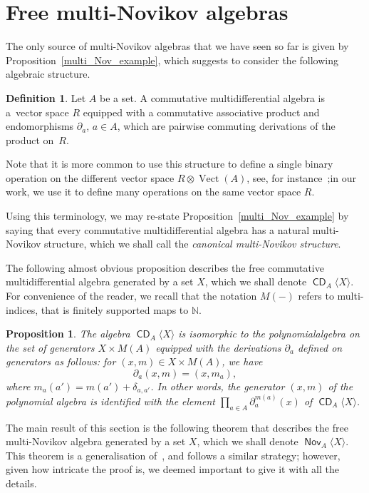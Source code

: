 \documentclass[10pt,a4paper]{article}
\newtheorem{prop}[theo]{Proposition}
\theoremstyle{definition}
\newtheorem{defi}[theo]{Definition}
\numberwithin{equation}{section}
\numberwithin{figure}{section}
\newcommand{\bbN}{\mathbb{N}}
\DeclareMathOperator{\CDi}{\mathsf{CD}}
\DeclareMathOperator{\Nov}{\mathsf{Nov}}
\DeclareMathOperator{\Vect}{Vect}
\begin{document}
\section{Free multi-Novikov algebras}\label{sec::3}
The only source of multi-Novikov algebras that we have seen so far is given by Proposition~\ref{multi_Nov_example}, which suggests to consider the following algebraic structure.

\begin{defi}
Let $A$ be a set. A commutative multidifferential algebra is a~vector space $R$ equipped with a commutative associative product and endomorphisms $\partial_a$, $a\in A$, which are pairwise commuting derivations of the product on~$R$.
\end{defi}

Note that it is more common to use this structure to define a single binary operation on the different vector space $R\otimes\Vect(A)$, see, for instance~\cite[Section~2.1]{Bur};\linebreak in our work, we use it to define many operations on the same vector space $R$.

Using this terminology, we may re-state Proposition~\ref{multi_Nov_example} by saying that every commutative multidifferential algebra has a natural multi-Novikov structure, which we shall call the \emph{canonical multi-Novikov structure}.

The following almost obvious proposition describes the free commutative multidifferential algebra generated by a set $X$, which we shall denote $\CDi_A\langle X\rangle$. For convenience of the reader, we recall that the notation $M(-)$ refers to multi-indices, that is finitely supported maps to $\bbN$.

\begin{prop}
The algebra $\CDi_A\langle X\rangle$ is isomorphic to the polynomial\linebreak algebra on the set of generators $X\times M(A)$ equipped with the derivations $\partial_a$ defined on generators as follows: for $(x,m)\in X\times M(A)$, we have
\[
\partial_a(x,m)=(x,m_a),
\]
where $m_a(a')=m(a')+\delta_{a,a'}$. In other words, the generator $(x,m)$ of the polynomial algebra is identified with the element $\prod_{a\in A}\partial_a^{m(a)}(x)$ of $\CDi_A\langle X\rangle$.
\end{prop}

The main result of this section is the following theorem that describes the free multi-Novikov algebra generated by a set $X$, which we shall denote $\Nov_A\langle X\rangle$. This theorem is a generalisation of~\cite[Theorem~7.8]{DL}, and follows a similar strategy; however, given how intricate the proof is, we deemed important to give it with all the details.
\end{document}

